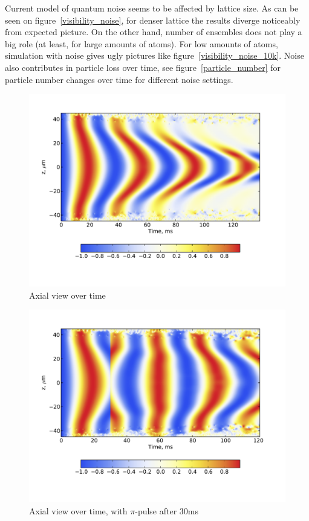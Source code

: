 \documentclass[12pt,notitlepage]{report}
\begin{document}
Current model of quantum noise seems to be affected by lattice size.
As can be seen on figure~\ref{visibility_noise}, for denser lattice the results diverge noticeably from expected picture.
On the other hand, number of ensembles does not play a big role (at least, for large amounts of atoms).
For low amounts of atoms, simulation with noise gives ugly pictures like figure~\ref{visibility_noise_10k}.
Noise also contributes in particle loss over time,
see figure~\ref{particle_number} for particle number changes over time for different noise settings.

\begin{figure}
\includegraphics[width=4.5in]{axial_view.pdf}
\caption{Axial view over time}
\label{axial_view}
\end{figure}

\begin{figure}
\includegraphics[width=4.5in]{axial_pi_pulse.pdf}
\caption{Axial view over time, with $\pi$-pulse after 30ms}
\label{axial_pi_pulse}
\end{figure}
\end{document}
